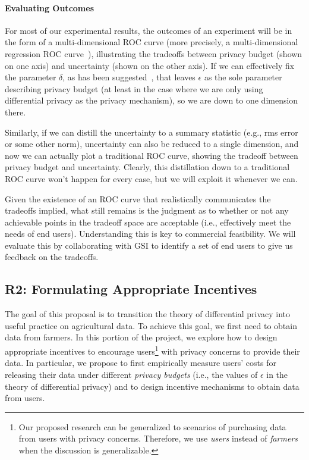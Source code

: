\paragraph{Evaluating Outcomes}
For most of our experimental results, the outcomes of an experiment
will be in the form of a multi-dimensional ROC curve
(more precisely, a multi-dimensional
regression ROC curve~\cite{Fawcett06,HO13,Mossman99}), illustrating
the tradeoffs between privacy budget (shown on one axis) and uncertainty
(shown on the other axis). If we can effectively fix the parameter $\delta$,
as has been suggested~\cite{dr14}, that leaves $\epsilon$ as the
sole parameter describing privacy budget (at least in the case where
we are only using differential privacy as the privacy mechanism), so we
are down to one dimension there.

Similarly, if we can distill the uncertainty to a summary statistic
(e.g., rms error or some other norm), uncertainty can also be reduced
to a single dimension, and now we can actually plot a traditional ROC
curve, showing the tradeoff between privacy budget and uncertainty.
Clearly, this distillation down to a traditional ROC curve won't happen
for every case, but we will exploit it whenever we can.

Given the existence of an ROC curve that realistically communicates the
tradeoffs implied, what still remains is the judgment as to whether or
not any achievable points in the tradeoff space are acceptable (i.e.,
effectively meet the needs of end users).  Understanding
this is key to commercial
feasibility. We will evaluate this by
collaborating with GSI to identify a set of end users
to give us feedback on the tradeoffs.

\subsection{R2: Formulating Appropriate Incentives}
\label{sec:fi}

The goal of this proposal is to transition the theory of differential privacy 
into useful practice on agricultural data. To achieve this goal, we first need
to obtain data from farmers.
In this portion of the project, we explore how to design appropriate 
incentives to encourage users\footnote{Our proposed research can be generalized
to scenarios of purchasing data from users with privacy concerns. Therefore,
we use \emph{users} instead of \emph{farmers} when the discussion is generalizable.}
with privacy concerns to provide their data. 
In particular, we propose to first empirically measure users' costs
for releasing their data under different \emph{privacy budgets} 
(i.e., the values of $\epsilon$ in the theory of differential privacy) 
and to design incentive mechanisms to obtain data from users.%

